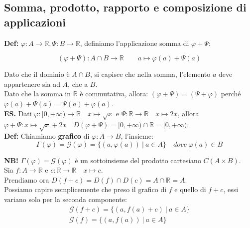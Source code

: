 \documentclass{article}
\begin{document}
\subsection{Somma, prodotto, rapporto e composizione di applicazioni}
\textbf{Def:} $\varphi: A \xrightarrow{} \mathbb{R}, \Psi: B \xrightarrow{} \mathbb{R}$, definiamo l'applicazione somma di $\varphi + \Psi$: 

\begin{equation*}
    (\varphi + \Psi): A \cap B \xrightarrow{} \mathbb{R} \qquad a \longmapsto \varphi(a) + \Psi(a)
\end{equation*}

\noindent Dato che il dominio è $A \cap B$, si capisce che nella somma, l'elemento $a$ deve appartenere sia ad $A$, che a $B$. \\

\noindent Dato che la somma in $\mathbb{R}$ è commutativa, allora: $(\varphi + \Psi) = (\Psi + \varphi)$ perché $\varphi(a) + \Psi(a) = \Psi(a) + \varphi(a)$.\\

\noindent\textbf{ES.} Dati $\varphi: [0, + \infty) \xrightarrow{} \mathbb{R} \quad x \longmapsto \sqrt{x}$ e $\Psi: \mathbb{R} \xrightarrow{} \mathbb{R} \quad x \longmapsto 2x$, allora $\varphi + \Psi: x \longmapsto \sqrt{x} + 2x \quad D(\varphi + \Psi) = [0, +\infty) \cap \mathbb{R} = [0, +\infty)$. \\

\noindent\textbf{Def:} Chiamiamo \textbf{grafico} di $\varphi: A \xrightarrow{} B$, l'insieme:
\begin{equation*}
    \Gamma(\varphi) = \mathcal{G}(\varphi) = \{(a, \varphi(a)) \ | \ a \in A\} \quad dove \ \varphi(a) \in B
\end{equation*}

\noindent\textbf{NB!} $\Gamma(\varphi) = \mathcal{G}(\varphi)$ è un sottoinsieme del prodotto cartesiano $C(A\times B)$. \\

\noindent Sia $f: A \xrightarrow{} \mathbb{R}$ e $c: \mathbb{R} \xrightarrow{} \mathbb{R} \quad x \longmapsto c$. \\
\noindent Prendiamo ora $D(f + c) = D(f) \cap D(c) = A \cap \mathbb{R} = A$. \\
\noindent Possiamo capire semplicemente che preso il grafico di $f$ e quello di $f + c$, essi variano solo per la seconda componente:
\begin{gather*}
    \mathcal{G}(f + c) = \{(a, f(a) + c) \ | \ a \in A\}\\
    \mathcal{G}(f) = \{(a, f(a)) \ | \ a \in A\}
\end{gather*}
\end{document}
